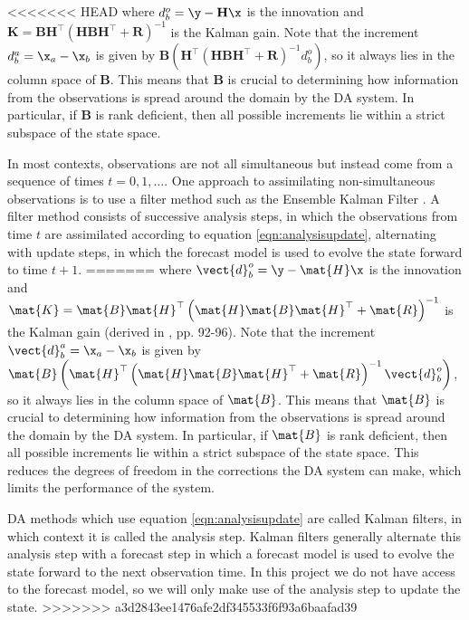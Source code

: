 <<<<<<< HEAD
where $d^o_b = \y - \mathbf{H}\x$ is the innovation and $\mathbf{K} = \mathbf{B}\mathbf{H}^\top\left(\mathbf{H}\mathbf{B}\mathbf{H}^\top + \mathbf{R}\right)^{-1}$ is the Kalman gain. Note that the increment $d^a_b = \x_a - \x_b$ is given by  $ \mathbf{B}\left(\mathbf{H}^\top\left(\mathbf{H}\mathbf{B}\mathbf{H}^\top + \mathbf{R}\right)^{-1} d^o_b \right)$, so it always lies in the column space of $\mathbf{B}$. This means that $\mathbf{B}$ is crucial to determining how information from the observations is spread around the domain by the DA system. In particular, if $\mathbf{B}$ is rank deficient, then all possible increments lie within a strict subspace of the state space. 

In most contexts, observations are not all simultaneous  but instead come from a sequence of times $t = 0,1,\dots$. One approach to assimilating non-simultaneous observations is to use a filter method such as the Ensemble Kalman Filter \parencite{Evensen1994,Houtekamer1998,Anderson2001}. A filter method consists of successive analysis steps, in which the observations from time $t$ are assimilated according to equation \ref{eqn:analysisupdate}, alternating with update steps, in which the forecast model is used to evolve the state forward to time $t+1$.
=======
where $\vect{d}^o_b = \y - \mat{H}\x$ is the innovation and $\mat{K} = \mat{B}\mat{H}^\top\left(\mat{H}\mat{B}\mat{H}^\top + \mat{R}\right)^{-1}$ is the Kalman gain (derived in \cite{Asch2016}, pp. 92-96). Note that the increment $\vect{d}^a_b = \x_a - \x_b$ is given by $ \mat{B}\left(\mat{H}^\top\left(\mat{H}\mat{B}\mat{H}^\top + \mat{R}\right)^{-1} \vect{d}^o_b \right)$, so it always lies in the column space of $\mat{B}$. This means that $\mat{B}$ is crucial to determining how information from the observations is spread around the domain by the DA system. In particular, if $\mat{B}$ is rank deficient, then all possible increments lie within a strict subspace of the state space. This reduces the degrees of freedom in the corrections the DA system can make, which limits the performance of the system.

DA methods which use equation \ref{eqn:analysisupdate} are called Kalman filters, in which context it is called the analysis step. Kalman filters generally alternate this analysis step with a forecast step in which a forecast model is used to evolve the state forward to the next observation time. In this project we do not have access to the forecast model, so we will only make use of the analysis step to update the state.
>>>>>>> a3d2843ee1476afe2df345533f6f93a6baafad39

